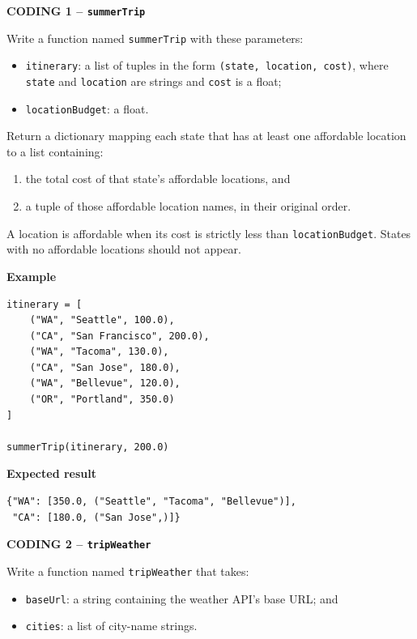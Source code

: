\documentclass[11pt,addpoints]{exam}
\begin{document}
\begin{questions}
\newpage
\question[12] \textbf{CODING 1 -- \texttt{summerTrip}}

Write a function named \texttt{summerTrip} with these parameters:
\begin{itemize}[leftmargin=1.4em,itemsep=0.2em]
  \item \texttt{itinerary}: a list of tuples in the form \texttt{(state, location, cost)}, where \texttt{state} and \texttt{location} are strings and \texttt{cost} is a float;
  \item \texttt{locationBudget}: a float.
\end{itemize}

Return a dictionary mapping each state that has at least one affordable location to a list containing:
\begin{enumerate}[leftmargin=1.6em,itemsep=0.2em]
  \item the total cost of that state's affordable locations, and
  \item a tuple of those affordable location names, in their original order.
\end{enumerate}

A location is affordable when its cost is strictly less than \texttt{locationBudget}. States with no affordable locations should not appear.

\textbf{Example}
\begin{lstlisting}
itinerary = [
    ("WA", "Seattle", 100.0),
    ("CA", "San Francisco", 200.0),
    ("WA", "Tacoma", 130.0),
    ("CA", "San Jose", 180.0),
    ("WA", "Bellevue", 120.0),
    ("OR", "Portland", 350.0)
]

summerTrip(itinerary, 200.0)
\end{lstlisting}

\textbf{Expected result}
\begin{lstlisting}
{"WA": [350.0, ("Seattle", "Tacoma", "Bellevue")],
 "CA": [180.0, ("San Jose",)]}
\end{lstlisting}

\vfill
\noindent\fbox{\parbox[t][4in][t]{\dimexpr\linewidth-2\fboxsep-2\fboxrule\relax}{\strut}}
\vfill
\newpage
\question[14] \textbf{CODING 2 -- \texttt{tripWeather}}

Write a function named \texttt{tripWeather} that takes:
\begin{itemize}[leftmargin=1.4em,itemsep=0.2em]
  \item \texttt{baseUrl}: a string containing the weather API's base URL; and
  \item \texttt{cities}: a list of city-name strings.
\end{itemize}


\end{questions}
\end{document}
